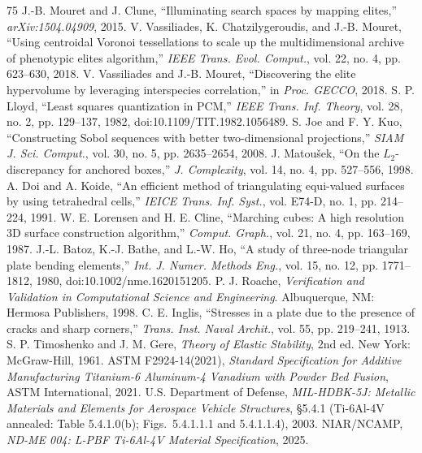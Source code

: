 \documentclass[10pt,journal,letterpaper]{IEEEtran}
\begin{document}
\begin{thebibliography}{75}
 J.-B. Mouret and J. Clune, ``Illuminating search spaces by mapping elites,'' \emph{arXiv:1504.04909}, 2015.
 V. Vassiliades, K. Chatzilygeroudis, and J.-B. Mouret, ``Using centroidal Voronoi tessellations to scale up the multidimensional archive of phenotypic elites algorithm,'' \emph{IEEE Trans. Evol. Comput.}, vol. 22, no. 4, pp. 623--630, 2018.
 V. Vassiliades and J.-B. Mouret, ``Discovering the elite hypervolume by leveraging interspecies correlation,'' in \emph{Proc. GECCO}, 2018.
 S. P. Lloyd, ``Least squares quantization in PCM,'' \emph{IEEE Trans. Inf. Theory}, vol. 28, no. 2, pp. 129--137, 1982, doi:10.1109/TIT.1982.1056489.
 S. Joe and F. Y. Kuo, ``Constructing Sobol sequences with better two-dimensional projections,'' \emph{SIAM J. Sci. Comput.}, vol. 30, no. 5, pp. 2635--2654, 2008.
 J. Matou\v{s}ek, ``On the $L_2$-discrepancy for anchored boxes,'' \emph{J. Complexity}, vol. 14, no. 4, pp. 527--556, 1998.
 A. Doi and A. Koide, ``An efficient method of triangulating equi-valued surfaces by using tetrahedral cells,'' \emph{IEICE Trans. Inf. Syst.}, vol. E74-D, no. 1, pp. 214--224, 1991.
 W. E. Lorensen and H. E. Cline, ``Marching cubes: A high resolution 3D surface construction algorithm,'' \emph{Comput. Graph.}, vol. 21, no. 4, pp. 163--169, 1987.
 J.-L. Batoz, K.-J. Bathe, and L.-W. Ho, ``A study of three-node triangular plate bending elements,'' \emph{Int. J. Numer. Methods Eng.}, vol. 15, no. 12, pp. 1771--1812, 1980, doi:10.1002/nme.1620151205.
 P. J. Roache, \emph{Verification and Validation in Computational Science and Engineering}. Albuquerque, NM: Hermosa Publishers, 1998.
 C. E. Inglis, ``Stresses in a plate due to the presence of cracks and sharp corners,'' \emph{Trans. Inst. Naval Archit.}, vol. 55, pp. 219--241, 1913.
 S. P. Timoshenko and J. M. Gere, \emph{Theory of Elastic Stability}, 2nd ed. New York: McGraw-Hill, 1961.
 ASTM F2924-14(2021), \emph{Standard Specification for Additive Manufacturing Titanium-6 Aluminum-4 Vanadium with Powder Bed Fusion}, ASTM International, 2021.
 U.S. Department of Defense, \emph{MIL-HDBK-5J: Metallic Materials and Elements for Aerospace Vehicle Structures}, \S 5.4.1 (Ti-6Al-4V annealed: Table 5.4.1.0(b); Figs.~5.4.1.1.1 and 5.4.1.1.4), 2003.
 NIAR/NCAMP, \emph{ND-ME 004: L-PBF Ti-6Al-4V Material Specification}, 2025.

\end{thebibliography}
\end{document}
